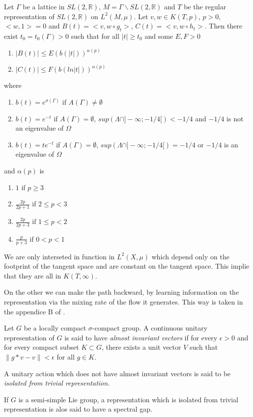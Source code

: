 \begin{thm}
Let $\Gamma$ be a lattice in $SL(2,\mathbb{R})$, $M=\Gamma \backslash SL(2,\mathbb{R})$ and $T$ be the regular representation of $SL(2,\mathbb{R})$ on $L^2 (M, \mu)$. Let $v,w\in K(T,p)$, $p>0$, $<w,1>=0$ and $B(t)=<v,w \circ g_t>$, $C(t)=<v,w \circ h_t>$.
Then there exist $t_0=t_0(\Gamma)>0$ such that for all $|t| \geq t_0$ and some $E,F > 0$
\begin{enumerate}
\item $|B(t)| \leq E( b(|t|))^{\alpha(p)}$
\item $|C(t)| \leq F( b(ln|t|))^{\alpha(p)}$
\end{enumerate}
where

\begin{enumerate}
\item $b(t)=e^{\sigma(\Gamma)}$ if $A(\Gamma) \neq \emptyset$
\item $b(t)=e^{-t}$ if $A(\Gamma) = \emptyset$, $sup(\Lambda \cap ]- \infty; -1/4[) < -1/4$ and $-1/4$ is not an eigenvalue of $\Omega$
\item $b(t)=te^{-t}$ if $A(\Gamma) = \emptyset$, $sup(\Lambda \cap ]- \infty; -1/4[)= -1/4$ or $-1/4$ is an eigenvalue of $\Omega$
\end{enumerate}
and $\alpha(p)$ is
\begin{enumerate}
\item $1$ if $p \geq 3$
\item $\frac{2p}{2p+1}$ if $2 \leq p < 3$
\item $\frac{2p}{2p+3}$ if $1 \leq p < 2$
\item $\frac{p}{p+3}$ if $0<p<1$
\end{enumerate}
\end{thm}

\begin{rmq}
We are only interseted in function in $L^2(X,\mu)$ which depend only on the footprint of the tangent space and are constant on the tangent space. This implie that they are all in $K(T,\infty)$.
\end{rmq}


On the other we can make the path backward, by learning information on the representation via the mixing rate of the flow it generates. This way is taken in the appendice B of \cite{2005math.....11614A}.

\begin{dfnt}
Let $G$ be a locally compact $\sigma$-compact group. A continuous unitary
 representation of $G$ is said to have \emph{almost invariant vectors}
 if for every $\epsilon > 0$ and for every compact subset $K \subset G$, there exists a unit vector $V$ such that $\|g*v-v\| < \epsilon$ for all $g \in K$.

 A unitary action which does not have almost invariant vectors is said to be \emph{isolated from trivial representation}.

 If $G$ is a semi-simple Lie group, a representation which is isolated from trivial representation is alos said to have a spectral gap.
\end{dfnt}

